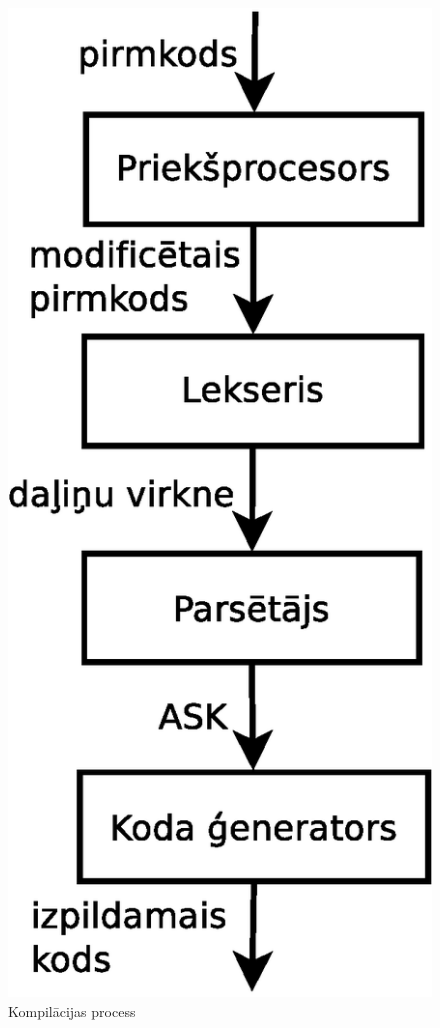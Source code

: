 \begin{figure}[H]
  \centering
    \includegraphics[scale=0.4]{pictures/usual_compiling}
  \caption{\label{fig:usual_compiling}Kompilācijas process}
\end{figure}

